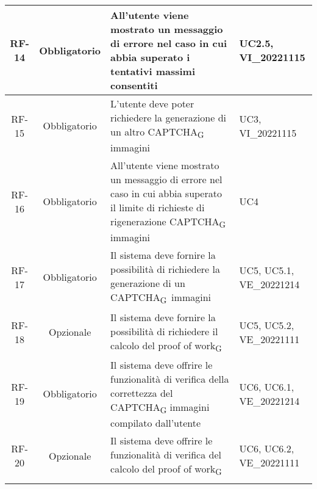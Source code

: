 \begin{tabularx}{\textwidth}{| c | c | X | X |}
   \hline
 RF-14 & Obbligatorio & All'utente viene mostrato un messaggio di errore nel caso in cui abbia superato i tentativi massimi consentiti &  UC2.5, VI\_20221115\\
 \hline
 RF-15 & Obbligatorio & L'utente deve poter richiedere la generazione di un altro CAPTCHA\textsubscript{G} immagini &  UC3, VI\_20221115\\
 \hline
 RF-16 & Obbligatorio & All'utente viene mostrato un messaggio di errore nel caso in cui abbia superato il limite di richieste di rigenerazione CAPTCHA\textsubscript{G} immagini &  UC4\\
 \hline
 RF-17 & Obbligatorio & Il sistema deve fornire la possibilità di richiedere la generazione di un CAPTCHA\textsubscript{G}\ immagini & UC5, UC5.1, VE\_20221214\\
  \hline
 RF-18 & Opzionale & Il sistema deve fornire la possibilità di richiedere il calcolo del proof of work\textsubscript{G} & UC5, UC5.2, VE\_20221111\\
 \hline
 RF-19 & Obbligatorio & Il sistema deve offrire le funzionalità di verifica della correttezza del CAPTCHA\textsubscript{G} immagini compilato dall'utente & UC6, UC6.1, VE\_20221214\\
 \hline
 RF-20 & Opzionale & Il sistema deve offrire le funzionalità di verifica del calcolo del proof of work\textsubscript{G} & UC6, UC6.2, VE\_20221111\\
 \hline
 \caption{Requisiti\textsubscript{G} funzionali}
\end{tabularx}

